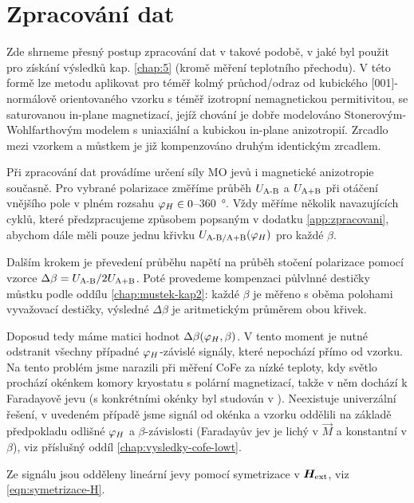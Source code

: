 \section{Zpracování dat}
\label{chap:zpracovani-dat}

Zde shrneme přesný postup zpracování dat v takové podobě, v jaké byl použit pro získání výsledků kap. \ref{chap:5} (kromě měření teplotního přechodu).
V této formě lze metodu aplikovat pro téměř kolmý průchod/odraz od kubického [001]-normálově orientovaného vzorku s téměř izotropní nemagnetickou permitivitou, se saturovanou in-plane magnetizací, jejíž chování je dobře modelováno Stonerovým-Wohlfarthovým modelem s uniaxiální a kubickou in-plane anizotropií.
Zrcadlo mezi vzorkem a můstkem je již kompenzováno druhým identickým zrcadlem.

Při zpracování dat provádíme určení síly MO jevů i magnetické anizotropie současně.
Pro vybrané polarizace změříme průběh $U_\textrm{A-B}$ a $U_\textrm{A+B}$ při otáčení vnějšího pole v plném rozsahu $\varphi_H \in 0$--\SI{360}{\degree}.
Vždy měříme několik navazujících cyklů, které předzpracujeme způsobem popsaným v dodatku \ref{app:zpracovani}, abychom dále měli pouze jednu křivku $U_\textrm{A-B/A+B}(\varphi_H)$ pro každé $\beta$.

Dalším krokem je převedení průběhu napětí na průběh stočení polarizace pomocí vzorce $\Delta\beta=U_\textrm{A-B}/2U_\textrm{A+B}$.
Poté provedeme kompenzaci půlvlnné destičky můstku podle oddílu \ref{chap:mustek-kap2}: každé $\beta$ je měřeno s oběma polohami vyvažovací destičky, výsledné $\Delta\beta$ je aritmetickým průměrem obou křivek.

Doposud tedy máme matici hodnot $\Delta\beta(\varphi_H, \beta)$.
V tento moment je nutné odstranit všechny případné $\varphi_H$-závislé signály, které nepochází přímo od vzorku.
Na tento problém jsme narazili při měření CoFe za nízké teploty, kdy světlo prochází okénkem komory kryostatu s polární magnetizací, takže v něm dochází k Faradayově jevu (s konkrétními okénky byl studován v \cite{baduraMagnetooptickaMereniPro2019}).
Neexistuje univerzální řešení, v uvedeném případě jsme signál od okénka a vzorku oddělili na základě předpokladu odlišné $\varphi_H$ a $\beta$-závislosti (Faradayův jev je lichý v $\vec{M}$ a konstantní v $\beta$), viz příslušný oddíl \ref{chap:vysledky-cofe-lowt}.

Ze signálu jsou odděleny lineární jevy pomocí symetrizace v $\bm{H}_\textrm{ext}$, viz \eqref{eqn:symetrizace-H}.

